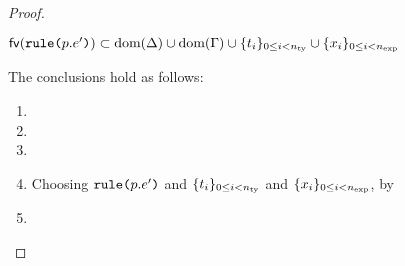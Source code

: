 \begin{proof}
\begin{grayparbox}
\begin{enumerate}
\begin{byCases}
\begin{pfsteps*}
         \item  $\mathsf{fv}(\texttt{rule}\texttt{(}p.e'\texttt{)}) \subset \text{dom}(\Delta) \cup \text{dom}(\Gamma) \cup \{t_i\}_{0 \leq i < n_\text{ty}} \cup \{x_i\}_{0 \leq i < n_\text{exp}}$ 
    \end{pfsteps*}
    The conclusions hold as follows:
    \begin{enumerate}
      \item {}
      \item {}
      \item {}
      \item Choosing $\texttt{rule}\texttt{(}p.e'\texttt{)}$ and $\{t_i\}_{0 \leq i < n_\text{ty}}$ and $\{x_i\}_{0 \leq i < n_\text{exp}}$, by 
      \item {}
    \end{enumerate}
    \resetpfcounter
  \end{byCases}
\end{enumerate}
\end{grayparbox}
\end{proof}

